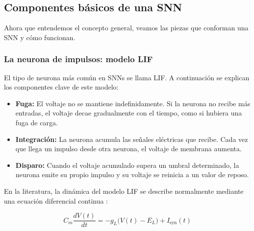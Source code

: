 


\subsection{Componentes básicos de una SNN}

Ahora que entendemos el concepto general, veamos las piezas que conforman una SNN y cómo funcionan.

\subsubsection{La neurona de impulsos: modelo LIF}

El tipo de neurona más común en SNNs se llama LIF. A continuación se explican los componentes clave de este modelo:

\begin{itemize}
    \item \textbf{Fuga:} El voltaje no se mantiene indefinidamente. Si la neurona no recibe más entradas, el voltaje decae gradualmente con el tiempo, como si hubiera una fuga de carga.
    \item \textbf{Integración:} La neurona acumula las señales eléctricas que recibe. Cada vez que llega un impulso desde otra neurona, el voltaje de membrana aumenta.
    \item \textbf{Disparo:} Cuando el voltaje acumulado supera un umbral determinado, la neurona emite su propio impulso y su voltaje se reinicia a un valor de reposo.
\end{itemize}

En la literatura, la dinámica del modelo LIF se describe normalmente mediante una ecuación diferencial continua \cite{gerstner2014neuronal, dayan2001theoretical}:

\begin{equation}
C_m \frac{dV(t)}{dt} = -g_L \big(V(t) - E_L\big) + I_{\text{syn}}(t)
\label{eq:lif-continuo}
\end{equation}

